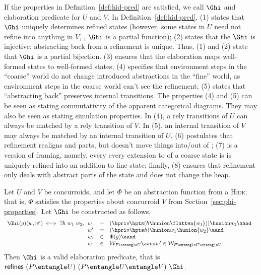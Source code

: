 If the properties in Definition~\ref{def:hid-pred} are satisfied, we
call $\Ghi$ and elaboration predicate for $U$ and $V$.  In
Definition~\ref{def:hid-pred}, (1) states that $\Ghi$ uniquely
determines refined states (however, some states in $U$ need not refine
into anything in $V$, \ie, $\Ghi$ is a partial function); (2)
states that the $\Ghi$ is injective: abstracting back from a
refinement is unique. Thus, (1) and (2) state that $\Ghi$ is a
partial bijection. (3) ensures that the elaboration maps well-formed
states to well-formed states; (4) specifies that environment steps in
the ``coarse'' world do not change introduced abstractions in the
``fine'' world, as environment steps in the coarse world can't see the
refinement; (5) states that ``abstracting back'' preserves internal
transitions. The properties (4) and (5) can be seen as stating
commutativity of the apparent categorical diagrams. They may also be
seen as stating simulation properties. In (4), a rely transitions of
$U$ can always be matched by a rely transition of $V$. In (5), an
internal transition of $V$ may always be matched by an internal
transition of $U$.  (6) postulates that refinement realigns \self and
\joint parts, but doesn't move things into/out of \other; (7) is a
version of framing, namely, every every extension to \other of a
coarse state is is uniquely refined into an addition to fine state;
finally, (8) ensures that refinement only deals with abstract parts of
the state and does not change the heap.

\begin{lemma}
\label{lm:hiding}

  Let $U$ and $V$ be concurroids, and let $\Phi$ be an abstraction
  function from a \textsc{Hide}; that is, $\Phi$ satisfies the
  properties about concurroid $V$ from
  Section~\ref{sec:phi-properties}. Let $\Ghi$ be constructed as
  follows.
\[
\begin{array}{l}
\Ghi (g)(w, w') \iff 
 \exists h\ w_1\ w_2,
   \begin{array}[t]{lcl}
   w & = & (\hpriv \hpts (h \hunion \flatten {w_1})) \hunion w_2\aand\hbox{}\\
   w' & = & (\hpriv \hpts h) \hunion w_1 \hunion {w_2}\aand\hbox{}\\
   w_1 & \in & \Phi(g)\aand\hbox{}\\
   w & \in & {\cal W}_{P \entangle U} \aand w' \in {\cal W}_{{P \entangle U}\entangle V}
   \end{array}
\end{array}
\]
Then $\Ghi$ is a valid elaboration predicate, that is
$\mathsf{refines}~(P \entangle U)~(P \entangle U \entangle
V)~\Ghi$.
\end{lemma}

